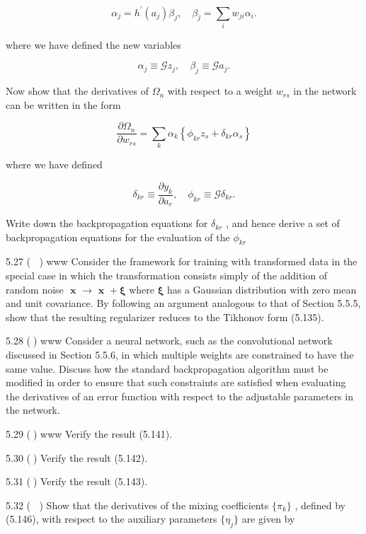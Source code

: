 \documentclass[
  10
]{article}
\begin{document}
\[
\alpha_ {j} = h ^ {\prime} (a _ {j}) \beta_ {j}, \quad \beta_ {j} = \sum_ {i} w _ {j i} \alpha_ {i}.\tag{5.204}
\]

where we have defined the new variables

\[
\alpha_ {j} \equiv \mathcal {G} z _ {j}, \quad \beta_ {j} \equiv \mathcal {G} a _ {j}.\tag{5.205}
\]

Now show that the derivatives of \(\Omega _ { n }\) with respect to a
weight \(w _ { r s }\) in the network can be written in the form

\[
\frac {\partial \Omega_ {n}}{\partial w _ {r s}} = \sum_ {k} \alpha_ {k} \left\{\phi_ {k r} z _ {s} + \delta_ {k r} \alpha_ {s} \right\}\tag{5.206}
\]

where we have defined

\[
\delta_ {k r} \equiv \frac {\partial y _ {k}}{\partial a _ {r}}, \quad \phi_ {k r} \equiv \mathcal {G} \delta_ {k r}.\tag{5.207}
\]

Write down the backpropagation equations for \(\delta _ { k r }\) , and
hence derive a set of backpropagation equations for the evaluation of
the \(\phi _ { k r }\)

5.27 ( ) www Consider the framework for training with transformed data
in the special case in which the transformation consists simply of the
addition of random noise
\({ \textbf { x } } \to { \textbf { x } } + \pmb { \xi }\) where
\(\boldsymbol { \xi }\) has a Gaussian distribution with zero mean and
unit covariance. By following an argument analogous to that of Section
5.5.5, show that the resulting regularizer reduces to the Tikhonov form
(5.135).

5.28 () www Consider a neural network, such as the convolutional network
discussed in Section 5.5.6, in which multiple weights are constrained to
have the same value. Discuss how the standard backpropagation algorithm
must be modified in order to ensure that such constraints are satisfied
when evaluating the derivatives of an error function with respect to the
adjustable parameters in the network.

5.29 () www Verify the result (5.141).

5.30 () Verify the result (5.142).

5.31 () Verify the result (5.143).

5.32 ( ) Show that the derivatives of the mixing coefficients
\(\{ \pi _ { k } \}\) , defined by (5.146), with respect to the
auxiliary parameters \(\{ \eta _ { j } \}\) are given by
\end{document}
